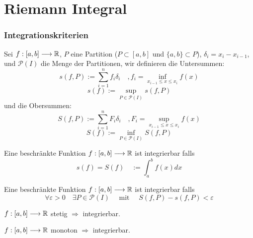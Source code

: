 \part{Riemann Integral}
\setcounter{section}{0}


\section{Integrationskriterien}

\Def Sei $f : [a,b] \longrightarrow \mathbb{R}$, $P$ eine Partition ($P \subset [a,b]$ und $\{a,b\} \subset P$), $\delta_{i} = x_i-x_{i-1}$,
und $\mathcal{P}(I)$ die Menge der Partitionen, wir definieren die Untersummen:
$$s(f, P):=\sum_{i=1}^{n} f_{i} \delta_{i} \quad, f_i = \inf_{x_{i-1}\leq x \leq x_i} f(x)$$
$$s(f):=\sup_{P \in \mathcal{P}(I)} s(f, P)$$
und die Obersummen:
$$S(f, P):=\sum_{i=1}^{n} F_{i} \delta_{i} \quad, F_i = \sup_{x_{i-1}\leq x \leq x_i} f(x)$$
$$S(f):=\inf_{P \in \mathcal{P}(I)} S(f, P)$$

\Def Eine beschränkte Funktion $f : [a,b] \longrightarrow \mathbb{R}$ ist integrierbar falls
$$s(f) = S(f) \quad := \int_{a}^{b} f(x) dx$$

\Satz Eine beschränkte Funktion $f : [a,b] \longrightarrow \mathbb{R}$ ist integrierbar falls
$$\forall \varepsilon>0 \quad \exists P \in \mathcal{P}(I) \quad \text { mit } \quad S(f, P)-s(f, P)<\varepsilon$$

\Satz $f : [a,b] \longrightarrow \mathbb{R}$  stetig $\Rightarrow$ integrierbar.

\Satz $f : [a,b] \longrightarrow \mathbb{R}$  monoton $\Rightarrow$ integrierbar.